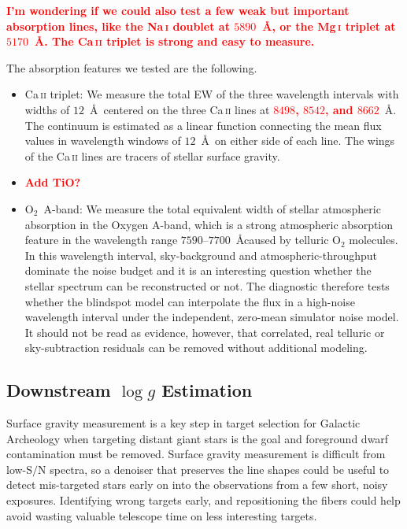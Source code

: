 \documentclass[twocolumn]{aastex7}
\newcommand{\ld}[1]{\textcolor{red}{\textbf{#1}}}
\newcommand{\SNR}{\mathrm{S}/\mathrm{N}}
\begin{document}
\ld{I'm wondering if we could also test a few weak but important absorption lines, like the Na\,\textsc{i} doublet at $5890$~\AA, or the Mg\,\textsc{i} triplet at $5170$~\AA. The Ca\,\textsc{ii} triplet is strong and easy to measure.}

The absorption features we tested are the following.
\begin{itemize}
\item Ca\,\textsc{ii} triplet: We measure the total EW of the three wavelength intervals with widths of $12$~\AA\, centered on the three Ca\,\textsc{ii} lines at \ld{$8498$, $8542$, and $8662$}~\AA. The continuum is estimated as a linear function connecting the mean flux values in wavelength windows of $12$~\AA\, on either side of each line.
The wings of the Ca\,\textsc{ii} lines are tracers of stellar surface gravity.
\item \ld{Add TiO?}
\item O$_2$~A-band: We measure the total equivalent width of stellar atmospheric absorption in the Oxygen A-band, which is a strong atmospheric absorption feature in the wavelength range $7590$--$7700$~\AA caused by telluric O$_2$ molecules. In this wavelength interval, sky-background and atmospheric-throughput dominate the noise budget and it is an interesting question whether the stellar spectrum can be reconstructed or not. The diagnostic therefore tests whether the blindspot model can interpolate the flux in a high-noise wavelength interval under the independent, zero-mean simulator noise model. It should not be read as evidence, however, that correlated, real telluric or sky-subtraction residuals can be removed without additional modeling.
\end{itemize}

\subsection{Downstream $\log g$ Estimation}

Surface gravity measurement is a key step in target selection for Galactic Archeology when targeting distant giant stars is the goal and foreground dwarf contamination must be removed. Surface gravity measurement is difficult from low-$\SNR$ spectra, so a denoiser that preserves the line shapes could be useful to detect mis-targeted stars early on into the observations from a few short, noisy exposures. Identifying wrong targets early, and repositioning the fibers could help avoid wasting valuable telescope time on less interesting targets.
\end{document}
